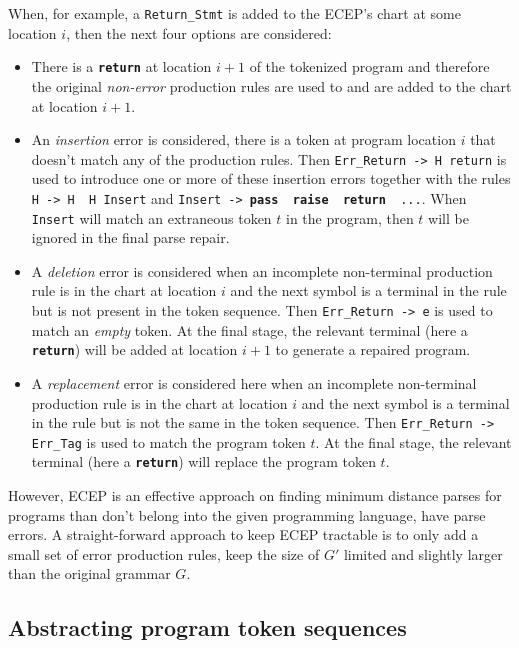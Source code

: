 When, for example, a \texttt{Return\_Stmt} is added to the ECEP's chart at some
location $i$, then the next four options are considered:
\begin{itemize}
  \item There is a \texttt{\bfseries return} at location $i+1$ of the tokenized
  program and therefore the original \emph{non-error} production rules are used
  to and are added to the chart at location $i+1$.
  \item An \emph{insertion} error is considered, \ie there is a token at program
  location $i$ that doesn't match any of the production rules. Then
  \texttt{Err\_Return -> H return} is used to introduce one or more of these
  insertion errors together with the rules \texttt{H -> H \textbar\ H Insert}
  and \texttt{Insert -> \textbf{pass} \textbar\ \textbf{raise} \textbar\
  \textbf{return} \textbar\ ...}. When \texttt{Insert} will match an
  extraneous token $t$ in the program, then $t$ will be ignored in the final
  parse repair.
  \item A \emph{deletion} error is considered when an incomplete non-terminal
  production rule is in the chart at location $i$ and the next symbol is a
  terminal in the rule but is not present in the token sequence. Then
  \texttt{Err\_Return -> e} is used to match an \emph{empty} token. At the final
  stage, the relevant terminal (here a \texttt{\textbf{return}}) will be added
  at location $i+1$ to generate a repaired program.
  \item A \emph{replacement} error is considered here when an incomplete
  non-terminal production rule is in the chart at location $i$ and the next
  symbol is a terminal in the rule but is not the same in the token sequence.
  Then \texttt{Err\_Return -> Err\_Tag} is used to match the program token $t$.
  At the final stage, the relevant terminal (here a \texttt{\textbf{return}})
  will replace the program token $t$.
\end{itemize}

However, ECEP is an effective approach on finding minimum distance parses for
programs than don't belong into the given programming language, \ie have parse
errors. A straight-forward approach to keep ECEP tractable is to only add a
small set of error production rules, \ie keep the size of $G'$ limited and
slightly larger than the original grammar $G$.

\subsection{Abstracting program token sequences}
\label{sec:overview:abstraction}

